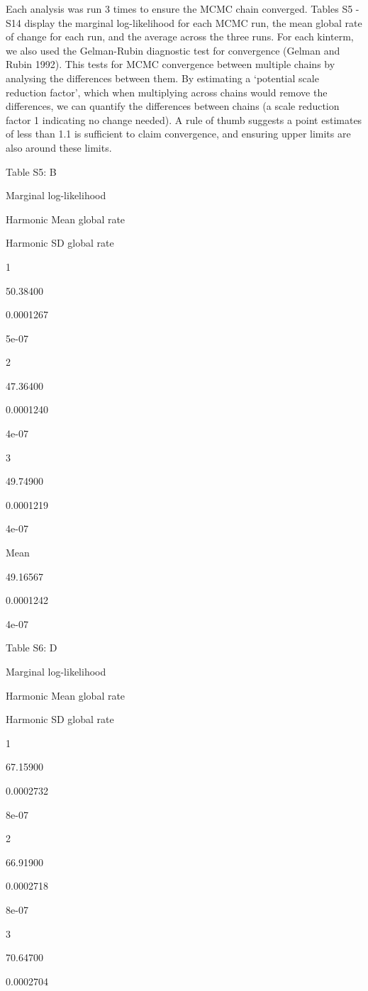 \documentclass[]{article}
\begin{document}
Each analysis was run 3 times to ensure the MCMC chain converged. Tables
S5 - S14 display the marginal log-likelihood for each MCMC run, the mean
global rate of change for each run, and the average across the three
runs. For each kinterm, we also used the Gelman-Rubin diagnostic test
for convergence (Gelman and Rubin 1992). This tests for MCMC convergence
between multiple chains by analysing the differences between them. By
estimating a `potential scale reduction factor', which when multiplying
across chains would remove the differences, we can quantify the
differences between chains (a scale reduction factor 1 indicating no
change needed). A rule of thumb suggests a point estimates of less than
1.1 is sufficient to claim convergence, and ensuring upper limits are
also around these limits.

Table S5: B

Marginal log-likelihood

Harmonic Mean global rate

Harmonic SD global rate

1

50.38400

0.0001267

5e-07

2

47.36400

0.0001240

4e-07

3

49.74900

0.0001219

4e-07

Mean

49.16567

0.0001242

4e-07

Table S6: D

Marginal log-likelihood

Harmonic Mean global rate

Harmonic SD global rate

1

67.15900

0.0002732

8e-07

2

66.91900

0.0002718

8e-07

3

70.64700

0.0002704
\end{document}
